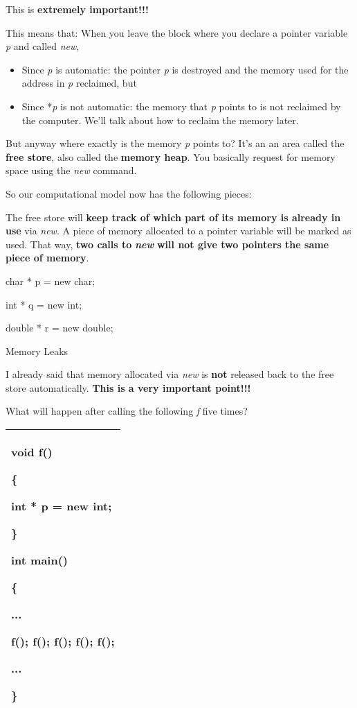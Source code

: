 \documentclass[
]{article}
\providecommand{\tightlist}{%
  \setlength{\itemsep}{0pt}\setlength{\parskip}{0pt}}
\begin{document}
This is \textbf{extremely important!!!}

This means that: When you leave the block where you declare a pointer
variable \emph{p} and called \emph{new},

\begin{itemize}
\tightlist
\item
  Since \emph{p} is automatic: the pointer \emph{p} is destroyed and the
  memory used for the address in \emph{p} reclaimed, but
\item
  Since *\emph{p} is not automatic: the memory that \emph{p} points to
  is not reclaimed by the computer. We'll talk about how to reclaim the
  memory later.
\end{itemize}

But anyway where exactly is the memory \emph{p} points to? It's an an
area called the \textbf{free store}, also called the \textbf{memory
heap}. You basically request for memory space using the \emph{new}
command.

So our computational model now has the following pieces:

The free store will \textbf{keep track of which part of its memory is
already in use} via \emph{new}. A piece of memory allocated to a pointer
variable will be marked as used. That way, \textbf{two calls to
}\emph{\textbf{new}}\textbf{ will not give two pointers the same piece
of memory}.

char * p = new char;

int * q = new int;

double * r = new double;

Memory Leaks

I already said that memory allocated via \emph{new} is \textbf{not}
released back to the free store automatically. \textbf{This is a very
important point!!!}

What will happen after calling the following \emph{f} five times?

\begin{longtable}[]{@{}l@{}}
\toprule
\endhead
\begin{minipage}[t]{0.97\columnwidth}\raggedright
void f()

\{

int * p = new int;

\}

int main()

\{

...

f(); f(); f(); f(); f();

...

\}\strut
\end{minipage}\tabularnewline
\bottomrule
\end{longtable}
\end{document}
